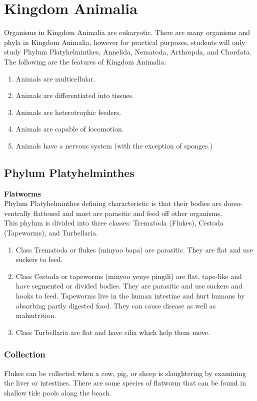 \section{Kingdom Animalia}
Organisms in Kingdom Animalia are eukaryotic. There are many organisms and phyla in Kingdom Animalia, however for practical purposes, students will only study Phylum Platyhelminthes, Annelida, Nematoda, Arthropda, and Chordata.\\
The following are the features of Kingdom Animalia:
\begin{enumerate}
\item{Animals are multicellular.}
\item{Animals are differentiated into tissues.}
\item{Animals are heterotrophic feeders.}
\item{Animals are capable of locomotion.}
\item{Animals have a nervous system (with the exception of sponges.)}
\end{enumerate}

\subsection{Phylum Platyhelminthes}

\textbf{Flatworms}\\ 
Phylum Platyhelminthes defining characteristic is that their bodies are dorso-ventrally flattened and most are parasitic and feed off other organisms.\\
This phylum is divided into three classes: Trematoda (Flukes), Cestoda (Tapeworms), and Turbellaria.
\begin{enumerate}
\item{Class Trematoda or flukes (minyoo bapa) are parasitic. They are flat and use suckers to feed.}
\item{Class Cestoda or tapeworms (minyoo yenye pingili) are flat, tape-like and have segmented or divided bodies. They are parasitic and use suckers and hooks to feed. Tapeworms live in the human intestine and hurt humans by absorbing partly digested food. They can cause disease as well as malnutrition.}
\item{Class Turbellaria are flat and have cilia which help them move.}
\end{enumerate}

\subsubsection{Collection}
 Flukes can be collected when a cow, pig, or sheep is slaughtering by examining the liver or intestines. There are some species of flatworm that can be found in shallow tide pools along the beach. 

